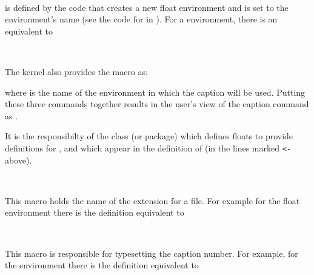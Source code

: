 \begin{syntax}
 \cmd{\@captype} \\
\end{syntax}
 \cmd{\@captype} is defined by the code that creates a new float 
environment and is set to the environment's name (see the code for 
\cmd{\@xfloat} in ). For a  environment,
 there is an equivalent to 
\begin{lcode}
\def\@captype{figure}
\end{lcode}

\begin{syntax}
 \cmd{\@caption} \\
\end{syntax}
 The kernel also provides the \cmd{\@caption} macro as:
\begin{lcode}
\long{}
 \end{lcode}
 where  is the name of the environment in which the caption
 will be used. Putting these three commands together results in the user's 
view of the caption command as \cmd{\caption}.

 It is the responsibilty of the class (or package) which defines 
floats to provide definitions for \cmd{\ext@type}, 
\cmd{\fnum@type} and \cmd{\@makecaption} which appear in the 
definition of \cmd{\@caption} (in the lines marked \verb?<-? above).

\begin{syntax}
 \cmd{\ext@type} \\
\end{syntax}
 This macro holds the name of the extension for a \listofx{} file.
 For example for the  float environment there is the
 definition equivalent to 
\begin{lcode}
 \newcommand{\ext@figure}{lof}
\end{lcode}

\begin{syntax}
 \cmd{\fnum@type} \\
\end{syntax}
 This macro is responsible for typesetting the caption number. For example,
 for the  environment there is the definition equivalent to
\begin{lcode}
 \newcommand{\fnum@figure}{\figurename~\thefigure}
\end{lcode}

